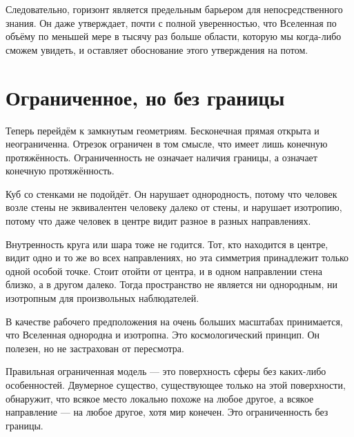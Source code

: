 Следовательно, горизонт является предельным барьером для непосредственного знания. Он даже утверждает, почти с полной уверенностью, что Вселенная по объёму по меньшей мере в тысячу раз больше области, которую мы когда-либо сможем увидеть, и оставляет обоснование этого утверждения на потом.

\section{Ограниченное, но без границы}

Теперь перейдём к замкнутым геометриям. Бесконечная прямая открыта и неограниченна. Отрезок ограничен в том смысле, что имеет лишь конечную протяжённость. Ограниченность не означает наличия границы, а означает конечную протяжённость.

Куб со стенками не подойдёт. Он нарушает однородность, потому что человек возле стены не эквивалентен человеку далеко от стены, и нарушает изотропию, потому что даже человек в центре видит разное в разных направлениях.

Внутренность круга или шара тоже не годится. Тот, кто находится в центре, видит одно и то же во всех направлениях, но эта симметрия принадлежит только одной особой точке. Стоит отойти от центра, и в одном направлении стена близко, а в другом далеко. Тогда пространство не является ни однородным, ни изотропным для произвольных наблюдателей.

В качестве рабочего предположения на очень больших масштабах принимается, что Вселенная однородна и изотропна. Это космологический принцип. Он полезен, но не застрахован от пересмотра.

\begin{classroomqa}
\end{classroomqa}

Правильная ограниченная модель — это поверхность сферы без каких-либо особенностей. Двумерное существо, существующее только на этой поверхности, обнаружит, что всякое место локально похоже на любое другое, а всякое направление — на любое другое, хотя мир конечен. Это ограниченность без границы.

